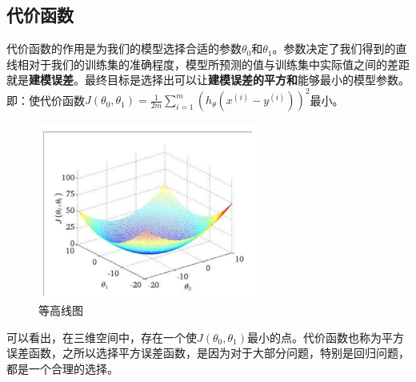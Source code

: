 \documentclass{article}
\begin{document}
\begin{large}
  \section{代价函数}
  代价函数的作用是为我们的模型选择合适的参数$\theta_0$和$\theta_1$。参数决定了我们得到的直线相对于我们的训练集的准确程度，模型所预测的值与训练集中实际值之间的差距就是\textbf{建模误差}。最终目标是选择出可以让\textbf{建模误差的平方和}能够最小的模型参数。即：使代价函数$J(\theta_0, \theta_1)=\frac{1}{2m}\sum_{i=1}^{m}(h_\theta(x^{(i)}-y^{(i)}))^2$最小。

  \begin{figure}[h]
    \centering
    \includegraphics{1.PNG}
    \caption{等高线图}
  \end{figure}
  可以看出，在三维空间中，存在一个使$J(\theta_0, \theta_1)$最小的点。代价函数也称为平方误差函数，之所以选择平方误差函数，是因为对于大部分问题，特别是回归问题，都是一个合理的选择。
\end{large}
\end{document}
